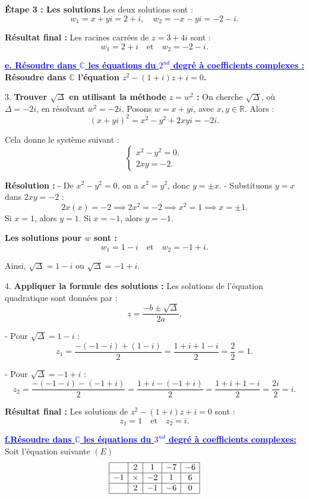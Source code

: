 \documentclass[12pt]{article}
\begin{document}
\textbf{Étape 3 : Les solutions}  
Les deux solutions sont :
\[
w_1 = x + yi = 2 + i, \quad w_2 = -x - yi = -2 - i.
\]

\textbf{Résultat final :}  
Les racines carrées de \( z = 3 + 4i \) sont :
\[
w_1 = 2 + i \quad \text{et} \quad w_2 = -2 - i.
\]

\underline{\textbf{\textcolor{blue}{e. Résoudre dans $\mathbb{C}$ les équations du $2^{nd}$ degré à coefficients complexes :}}}\\
\textbf{Résoudre dans \( \mathbb{C} \) l’équation \( z^2 - (1 + i)z + i = 0 \).}

3. \textbf{Trouver \( \sqrt{\Delta} \) en utilisant la méthode \( z = w^2 \) :}  
On cherche \( \sqrt{\Delta} \), où \( \Delta = -2i \), en résolvant \( w^2 = -2i \).  
Posons \( w = x + yi \), avec \( x, y \in \mathbb{R} \). Alors :
\[
(x + yi)^2 = x^2 - y^2 + 2xyi = -2i.
\]

Cela donne le système suivant :
\[
\begin{cases}
x^2 - y^2 = 0, \\
2xy = -2.
\end{cases}
\]

\textbf{Résolution :}
- De \( x^2 - y^2 = 0 \), on a \( x^2 = y^2 \), donc \( y = \pm x \).
- Substituons \( y = x \) dans \( 2xy = -2 \) :
  \[
  2x(x) = -2 \implies 2x^2 = -2 \implies x^2 = 1 \implies x = \pm 1.
  \]
  Si \( x = 1 \), alors \( y = 1 \).  
  Si \( x = -1 \), alors \( y = -1 \).

\textbf{Les solutions pour \( w \) sont :}
\[
w_1 = 1 - i \quad \text{et} \quad w_2 = -1 + i.
\]

Ainsi, \( \sqrt{\Delta} = 1 - i \) ou \( \sqrt{\Delta} = -1 + i \).

4. \textbf{Appliquer la formule des solutions :}  
Les solutions de l’équation quadratique sont données par :
\[
z = \frac{-b \pm \sqrt{\Delta}}{2a}.
\]

- Pour \( \sqrt{\Delta} = 1 - i \) :
  \[
  z_1 = \frac{-(-1 - i) + (1 - i)}{2} = \frac{1 + i + 1 - i}{2} = \frac{2}{2} = 1.
  \]

- Pour \( \sqrt{\Delta} = -1 + i \) :
  \[
  z_2 = \frac{-(-1 - i) - (-1 + i)}{2} = \frac{1 + i - (-1 + i)}{2} = \frac{1 + i + 1 - i}{2} = \frac{2i}{2} = i.
  \]

\textbf{Résultat final :}  
Les solutions de \( z^2 - (1 + i)z + i = 0 \) sont :
\[
z_1 = 1 \quad \text{et} \quad z_2 = i.
\]


\underline{\textbf{\textcolor{blue}{f.Résoudre dans $\mathbb{C}$ les équations du $3^{nd}$ degré à coefficients complexes:}}}\\
Soit l'équation suivante $(E)$ 
\[
\begin{array}{|c|c|c|c|c|}
\hline
 & 2 & 1 & -7 & -6  \\ 
\hline
-1 & \times & -2 & 1 & 6 \\ 
\hline
 & 2 & -1 & -6 & 0  \\
\hline
\end{array}
\]
\end{document}
